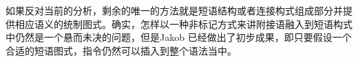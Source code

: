 \begin{exe}
\begin{xlist}[iv.]
\begin{exe}
\begin{xlist}[iv.]

如果反对当前的分析，剩余的唯一的方法就是短语结构或者连接构式组成部分并提供相应语义的统制图式。确实，怎样以一种非标记方式来讲附接语融入到短语构式中仍然是一个悬而未决的问题，但是Jakob \citet{Mache2010a}已经做出了初步成果，即只要假设一个合适的短语图式，指令仍然可以插入到整个语法当中。


\end{xlist}
\end{exe}
\end{xlist}
\end{exe}
